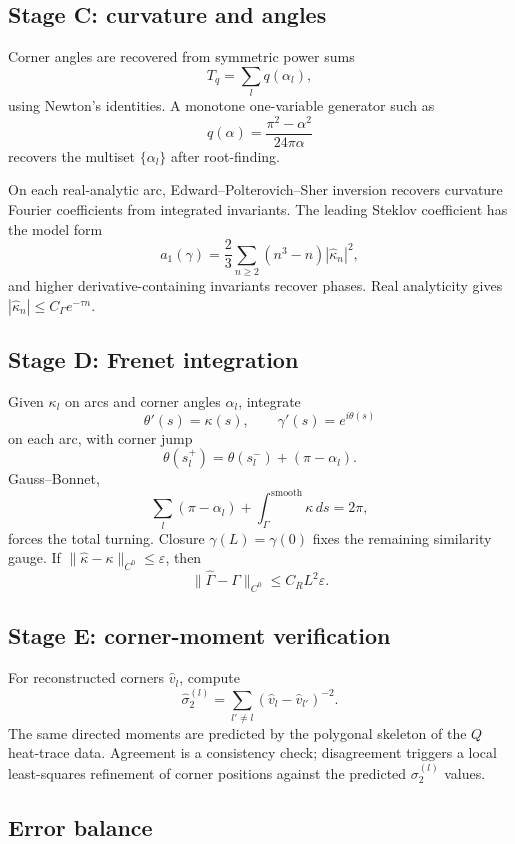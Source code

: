 \documentclass[11pt,reqno]{amsart}
\theoremstyle{plain}
\theoremstyle{definition}
\theoremstyle{remark}
\newcommand{\Qop}{Q}
\begin{document}
\subsection{Stage C: curvature and angles}\label{app:ss-stage-C}

Corner angles are recovered from symmetric power sums
\[
T_q=\sum_l q(\alpha_l),
\]
using Newton's identities. A monotone one-variable generator such as
\[
q(\alpha)=\frac{\pi^2-\alpha^2}{24\pi\alpha}
\]
recovers the multiset $\{\alpha_l\}$ after root-finding.

On each real-analytic arc, Edward--Polterovich--Sher inversion recovers curvature Fourier coefficients from integrated invariants. The leading Steklov coefficient has the model form
\[
a_1(\gamma)=\frac23\sum_{n\geq2}(n^3-n)|\widehat\kappa_n|^2,
\]
and higher derivative-containing invariants recover phases. Real analyticity gives $|\widehat\kappa_n|\leq C_\Gamma e^{-\tau n}$.

\subsection{Stage D: Frenet integration}\label{app:ss-stage-D}

Given $\kappa_l$ on arcs and corner angles $\alpha_l$, integrate
\[
\theta'(s)=\kappa(s),\qquad
\gamma'(s)=e^{i\theta(s)}
\]
on each arc, with corner jump
\[
\theta(s_l^+)=\theta(s_l^-)+(\pi-\alpha_l).
\]
Gauss--Bonnet,
\[
\sum_l(\pi-\alpha_l)+\int_\Gamma^{\mathrm{smooth}}\kappa\,ds=2\pi,
\]
forces the total turning. Closure $\gamma(L)=\gamma(0)$ fixes the remaining similarity gauge. If $\|\widehat\kappa-\kappa\|_{C^0}\leq\varepsilon$, then
\[
\|\widehat\Gamma-\Gamma\|_{C^0}\leq C_RL^2\varepsilon.
\]

\subsection{Stage E: corner-moment verification}\label{app:ss-stage-E}

For reconstructed corners $\widehat v_l$, compute
\[
\widehat\sigma_2^{(l)}=\sum_{l'\neq l}(\widehat v_l-\widehat v_{l'})^{-2}.
\]
The same directed moments are predicted by the polygonal skeleton of the $\Qop$ heat-trace data. Agreement is a consistency check; disagreement triggers a local least-squares refinement of corner positions against the predicted $\sigma_2^{(l)}$ values.

\subsection{Error balance}\label{app:ss-error-balance}
\end{document}
